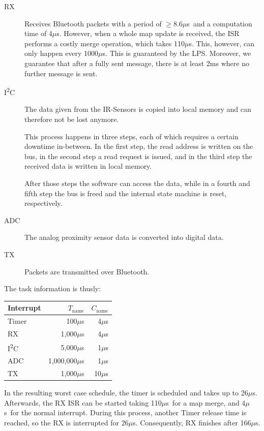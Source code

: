 \documentclass[a4paper,parskip,headheight=38pt]{scrartcl} %
\newcommand{\mics}{$\mu$s}
\begin{document}
{\begin{description}
        \item[RX] Receives Bluetooth packets with a period of $\geq$8.6\mics\ 
        and a computation time of 4\mics. However, when a whole map update is
        received, the ISR performs a costly merge operation, which takes
        110\mics. This, however, can only happen every 1000\mics. This is
        guaranteed by the LPS. Moreover, we
        guarantee that after a fully sent message, there is at least 2ms where
        no further message is sent.
        \item[I\textsuperscript{2}C] The data given from the IR-Sensors is copied into local
        memory and can therefore not be lost anymore.

        This process happens in three steps, each of which requires a
        certain downtime in-between. In the first step, the read address is
        written on the bus,
        in the second step a read request is issued, and in the third step the
        received data is written in local memory. 

        After those steps the software can access the data, while in a fourth
        and fifth step the bus is freed and the internal state machine is reset,
        respectively.
        \item[ADC] The analog proximity sensor data is converted into digital
        data.
        \item[TX] Packets are transmitted over Bluetooth.
    \end{description}
    The task information is thusly:
    \begin{center}
    \begin{tabular}{l | r | r}
        Interrupt & $T_{\text{name}}$ & $C_\text{name}$ \\
        \hline
        Timer    & 100\mics       & 4\mics \\
        RX       & 1,000\mics     & 4\mics \\
        I\textsuperscript{2}C      & 5,000\mics     & 1\mics \\
        ADC      & 1,000,000\mics & 1\mics \\
        TX       & 1,000\mics     & 10\mics \\
    \end{tabular}
    \end{center}
    In the resulting worst case schedule, the timer is scheduled and takes up to
    26\mics. Afterwards, the RX ISR can be started taking 110\mics\  for a map
    merge, and 4\mics\  for the normal interrupt. During this process, another
    Timer release time is reached, so the RX is interrupted for 26\mics.
    Consequently, RX finishes after 166\mics.

}
\end{document}
